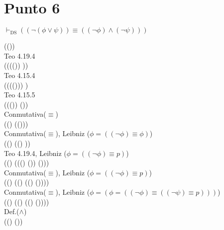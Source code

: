 \documentclass{article}
\begin{document}
\section{Punto 6}
\begin{logicenv}[5]{$\vdash_{\text{DS}} ((\neg  (\phi \lor \psi)) \equiv ((\neg \phi) \land (\neg \psi)))$}
    \begin{derivation}
        (\neg(\phi \lor \psi))\\
        Teo 4.19.4\\
        (\neg ((\phi \lor (\neg \psi)) \equiv \phi))\\
        Teo 4.15.4\\
        ((\neg(\phi \lor (\neg \psi))) \equiv \phi)\\
        Teo 4.15.5\\
        ((\phi \lor (\neg \psi)) \equiv (\neg \phi))\\
        Conmutativa($\equiv$)\\
        ((\neg \phi) \equiv (\phi \lor (\neg \psi)))\\
        Conmutativa($\equiv$), Leibniz ($\phi = ((\neg \phi) \equiv \phi)$)\\
        ((\neg \phi) \equiv ((\neg \psi) \lor \phi))\\
        Teo 4.19.4, Leibniz ($\phi = ((\neg \phi) \equiv p)$)\\
        ((\neg \phi) \equiv (((\neg \psi) \lor (\neg \phi)) \equiv (\neg \psi)))\\
        Conmutativa($\equiv$), Leibniz ($\phi = ((\neg \phi) \equiv p)$)\\
        ((\neg \phi) \equiv ((\neg \psi) \equiv ((\neg \psi) \lor (\neg \phi))))\\
        Conmutativa($\equiv$), Leibniz ($\phi = (\phi = ((\neg \phi) \equiv ((\neg \psi) \equiv p)))$)\\
        ((\neg \phi) \equiv ((\neg \psi) \equiv ((\neg \phi) \lor (\neg \psi))))\\
        Def.($\land$)\\
        ((\neg \phi) \land (\neg \psi))
    \end{derivation}
\end{logicenv}
\end{document}
